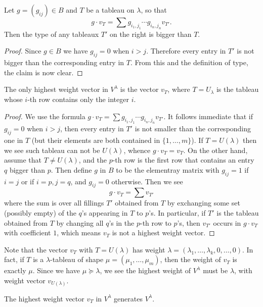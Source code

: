 \begin{lemma}
Let $g=(g_{ij})\in B$ and $T$ be a tableau on $\lambda$, so that
\[g\cdot v_T=\sum g_{i_1,j_1}\cdots g_{i_n,j_n}v_{T'}.\]
Then the type of any tableaux $T'$ on the right is bigger than $T$. 
\end{lemma}
\begin{proof}
Since $g\in B$ we have $g_{ij}=0$ when $i>j$. Therefore every entry in $T'$ is not bigger than the corresponding entry in $T$. From this and the definition of type, the claim is now clear.
\end{proof}
\begin{proposition}
The only highest weight vector in $V^\lambda$ is the vector $v_T$, where $T=U_\lambda$ is the tableau whose $i$-th row contains only the integer $i$. 
\end{proposition}
\begin{proof}
We use the formula $g\cdot v_T=\sum g_{i_1,j_1}\cdots g_{i_n,j_n}v_{T'}$. It follows immediate that if $g_{ij}=0$ when $i>j$, then every entry in $T'$ is not smaller than the corresponding one in $T$ (but their elements are both contained in $\{1,\dots,m\}$). If $T=U(\lambda)$ then we see such tableau can not be $U(\lambda)$, whence $g\cdot v_T=v_T$. On the other hand, assume that $T\neq U(\lambda)$, and the $p$-th row is the first row that contains an entry $q$ bigger than $p$. Then define $g$ in $B$ to be the elementray matrix with $g_{ij}=1$ if $i=j$ or if $i=p,j=q$, and $g_{ij}=0$ otherwise. Then we see
\[g\cdot v_T=\sum v_{T'}\]
where the sum is over all fillings $T'$ obtained from $T$ by exchanging some set (possibly empty) of the $q$'s appearing in $T$ to $p$'s. In particular, if $T'$ is the tableau obtained from $T$ by changing all $q$'s in the $p$-th row to $p$'s, then $v_{T'}$ occurs in $g\cdot v_T$ with coefficient $1$, which means $v_T$ is not a highest weight vector.
\end{proof}
\begin{remark}
Note that the vector $v_T$ with $T=U(\lambda)$ has weight $\lambda=(\lambda_1,\dots,\lambda_k,0,\dots,0)$. In fact, if $T$ is a $\lambda$-tableau of shape $\mu=(\mu_1,\dots,\mu_m)$, then the weight of $v_T$ is exactly $\mu$. Since we have $\mu\succeq\lambda$, we see the highest weight of $V^\lambda$ must be $\lambda$, with weight vector $v_{U(\lambda)}$.
\end{remark}
\begin{proposition}
The highest weight vector $v_T$ in $V^\lambda$ generates $V^\lambda$.
\end{proposition}
